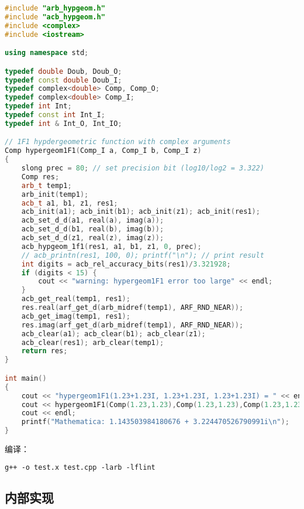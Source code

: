 \begin{lstlisting}[language=cpp, caption=test.cpp]
#include "arb_hypgeom.h"
#include "acb_hypgeom.h"
#include <complex>
#include <iostream>

using namespace std;

typedef double Doub, Doub_O;
typedef const double Doub_I;
typedef complex<double> Comp, Comp_O;
typedef complex<double> Comp_I;
typedef int Int;
typedef const int Int_I;
typedef int & Int_O, Int_IO;

// 1F1 hypdergeometric function with complex arguments
Comp hypergeom1F1(Comp_I a, Comp_I b, Comp_I z)
{
	slong prec = 80; // set precision bit (log10/log2 = 3.322)
	Comp res;
	arb_t temp1;
	arb_init(temp1);
	acb_t a1, b1, z1, res1;
	acb_init(a1); acb_init(b1); acb_init(z1); acb_init(res1);
	acb_set_d_d(a1, real(a), imag(a));
	acb_set_d_d(b1, real(b), imag(b));
	acb_set_d_d(z1, real(z), imag(z));
	acb_hypgeom_1f1(res1, a1, b1, z1, 0, prec);
	// acb_printn(res1, 100, 0); printf("\n"); // print result
	int digits = acb_rel_accuracy_bits(res1)/3.321928;
	if (digits < 15) {
		cout << "warning: hypergeom1F1 error too large" << endl;
	}
	acb_get_real(temp1, res1);
	res.real(arf_get_d(arb_midref(temp1), ARF_RND_NEAR));
	acb_get_imag(temp1, res1);
	res.imag(arf_get_d(arb_midref(temp1), ARF_RND_NEAR));
	acb_clear(a1); acb_clear(b1); acb_clear(z1);
    acb_clear(res1); arb_clear(temp1);
	return res;
}

int main()
{
	cout << "hypergeom1F1(1.23+1.23I, 1.23+1.23I, 1.23+1.23I) = " << endl;
	cout << hypergeom1F1(Comp(1.23,1.23),Comp(1.23,1.23),Comp(1.23,1.23))
    cout << endl;
	printf("Mathematica: 1.143503984180676 + 3.224470526790991i\n");
}
\end{lstlisting}
编译：
\begin{lstlisting}[language=makefile]
g++ -o test.x test.cpp -larb -lflint
\end{lstlisting}

\subsection{内部实现}
